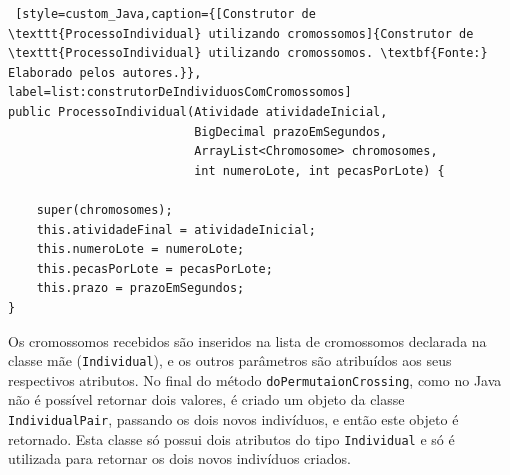 \begin{lstlisting} [style=custom_Java,caption={[Construtor de \texttt{ProcessoIndividual} utilizando cromossomos]{Construtor de \texttt{ProcessoIndividual} utilizando cromossomos. \textbf{Fonte:} Elaborado pelos autores.}}, label=list:construtorDeIndividuosComCromossomos] 
public ProcessoIndividual(Atividade atividadeInicial, 
						  BigDecimal prazoEmSegundos, 
						  ArrayList<Chromosome> chromosomes, 
						  int numeroLote, int pecasPorLote) {

	super(chromosomes);
	this.atividadeFinal = atividadeInicial;
	this.numeroLote = numeroLote;
	this.pecasPorLote = pecasPorLote;
	this.prazo = prazoEmSegundos;
}

\end{lstlisting}
\par Os cromossomos recebidos são inseridos na lista de cromossomos declarada na classe mãe (\texttt{Individual}), e os 
outros parâmetros são atribuídos aos seus respectivos atributos. No final do método \texttt{doPermutaionCrossing}, como no 
Java não é possível retornar dois valores, é criado um objeto da classe \texttt{IndividualPair}, passando os dois novos indivíduos, 
e então este objeto é retornado. Esta classe só possui dois atributos do tipo \texttt{Individual} e só é utilizada para retornar os dois 
novos indivíduos criados.


